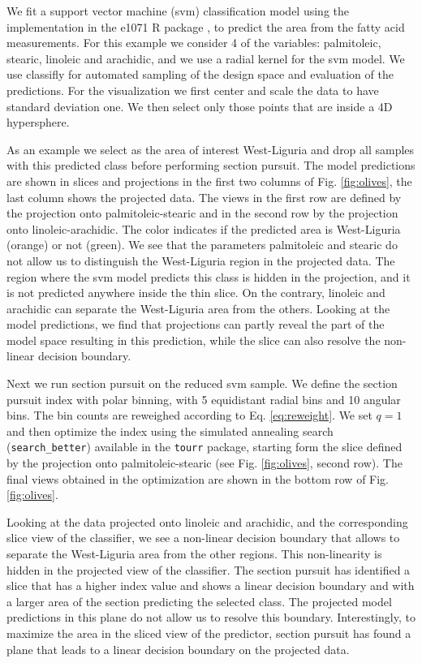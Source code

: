 \documentclass[]{interact}
\theoremstyle{plain}%
\theoremstyle{definition}
\theoremstyle{remark}
\begin{document}
We fit a support vector machine (svm) classification model using the
implementation in the e1071 R package \citep{e1071}, to predict the area
from the fatty acid measurements. For this example we consider 4 of the
variables: palmitoleic, stearic, linoleic and arachidic, and we use a
radial kernel for the svm model. We use classifly for automated sampling
of the design space and evaluation of the predictions. For the
visualization we first center and scale the data to have standard
deviation one. We then select only those points that are inside a 4D
hypersphere.

As an example we select as the area of interest West-Liguria and drop
all samples with this predicted class before performing section pursuit.
The model predictions are shown in slices and projections in the first
two columns of Fig. \ref{fig:olives}, the last column shows the
projected data. The views in the first row are defined by the projection
onto palmitoleic-stearic and in the second row by the projection onto
linoleic-arachidic. The color indicates if the predicted area is
West-Liguria (orange) or not (green). We see that the parameters
palmitoleic and stearic do not allow us to distinguish the West-Liguria
region in the projected data. The region where the svm model predicts
this class is hidden in the projection, and it is not predicted anywhere
inside the thin slice. On the contrary, linoleic and arachidic can
separate the West-Liguria area from the others. Looking at the model
predictions, we find that projections can partly reveal the part of the
model space resulting in this prediction, while the slice can also
resolve the non-linear decision boundary.

Next we run section pursuit on the reduced svm sample. We define the
section pursuit index with polar binning, with 5 equidistant radial bins
and 10 angular bins. The bin counts are reweighed according to Eq.
\ref{eq:reweight}. We set \(q=1\) and then optimize the index using the
simulated annealing search (\texttt{search\_better}) available in the
\texttt{tourr} package, starting form the slice defined by the
projection onto palmitoleic-stearic (see Fig. \ref{fig:olives}, second
row). The final views obtained in the optimization are shown in the
bottom row of Fig. \ref{fig:olives}.

Looking at the data projected onto linoleic and arachidic, and the
corresponding slice view of the classifier, we see a non-linear decision
boundary that allows to separate the West-Liguria area from the other
regions. This non-linearity is hidden in the projected view of the
classifier. The section pursuit has identified a slice that has a higher
index value and shows a linear decision boundary and with a larger area
of the section predicting the selected class. The projected model
predictions in this plane do not allow us to resolve this boundary.
Interestingly, to maximize the area in the sliced view of the predictor,
section pursuit has found a plane that leads to a linear decision
boundary on the projected data.
\end{document}
